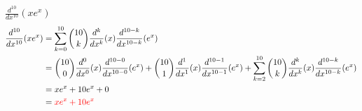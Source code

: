 \item [2.] $\displaystyle \frac{d^{10}}{dx^{10}} (xe^x)$
\begin{align*}
    \frac{d^{10}}{dx^{10}} (xe^x)
    &= \sum_{k=0}^{10} \binom{10}{k}
    \frac{d^{k}}{dx^{k}} (x)
    \frac{d^{10-k}}{dx^{10-k}} (e^x)\\
    &= 
    \binom{10}{0}
    \frac{d^{0}}{dx^{0}} (x)
    \frac{d^{10-0}}{dx^{10-0}} (e^x)
    +
    \binom{10}{1}
    \frac{d^{1}}{dx^{1}} (x)
    \frac{d^{10-1}}{dx^{10-1}} (e^x)
    +
    \sum_{k=2}^{10} \binom{10}{k}
    \frac{d^{k}}{dx^{k}} (x)
    \frac{d^{10-k}}{dx^{10-k}} (e^x)\\
    &= 
    xe^x
    +
    10
    e^x
    +
    0\\
    &= \textcolor{red}{xe^x+10e^x}
\end{align*}